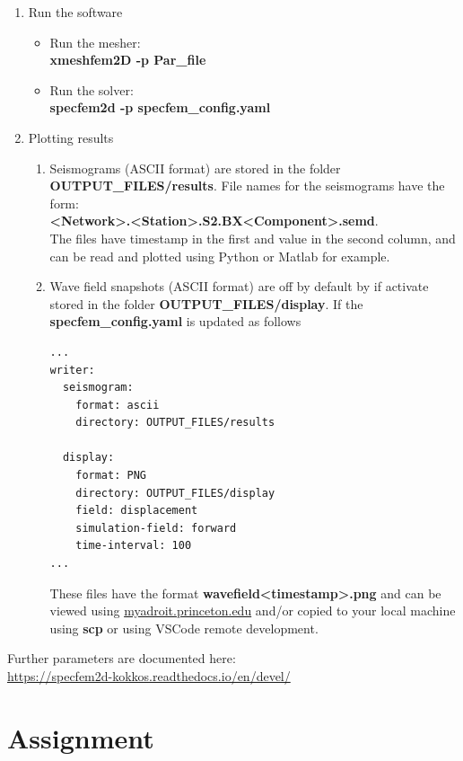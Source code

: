 \documentclass[11pt,titlepage,fleqn]{article}
\begin{document}
\begin{enumerate}
\item Run the software
  \begin{itemize}
    \item Run the mesher:\\
          {\bf xmeshfem2D -p Par\_file}
    \item Run the solver:\\
          {\bf specfem2d -p specfem\_config.yaml}
  \end{itemize}

\item  Plotting results
  \begin{enumerate}
    \item Seismograms (ASCII format) are stored in the folder {\bf OUTPUT\_FILES/results}. File names for the seismograms have the form: \\
        {\bf  <Network>.<Station>.S2.BX<Component>.semd}. \\
        The files have timestamp in the first and value in the second column, and can be read and plotted using Python or Matlab for example.

    \item Wave field snapshots (ASCII format) are off by default by if activate stored in the folder {\bf OUTPUT\_FILES/display}. If the {\bf specfem\_config.yaml} is updated as follows
\begin{lstlisting}
...
writer:
  seismogram:
    format: ascii
    directory: OUTPUT_FILES/results

  display:
    format: PNG
    directory: OUTPUT_FILES/display
    field: displacement
    simulation-field: forward
    time-interval: 100
...
\end{lstlisting}
         These files have the format {\bf wavefield<timestamp>.png} and can be viewed using \url{myadroit.princeton.edu} and/or copied to your local machine using {\bf scp} or using VSCode remote development.
   
  \end{enumerate}

\end{enumerate}

\noindent Further parameters are documented here:\\
\phantom{ } \url{https://specfem2d-kokkos.readthedocs.io/en/devel/}


\section*{Assignment}
\end{document}
